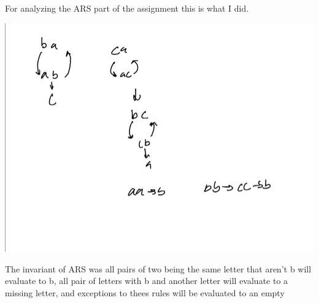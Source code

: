 \documentclass{article}
\theoremstyle{theorem}
\theoremstyle{definition}
\theoremstyle{remark}
\begin{document}
For analyzing the ARS part of the assignment this is what I did.
\begin{center}

\includegraphics[scale=0.5]{hw91}
\end{center}

The invariant of ARS was all pairs of two being the same letter that aren't b will evaluate to b, all pair of letters with b and another letter will evaluate to a missing letter, and exceptions to thees rules will be evaluated to an empty
\end{document}
